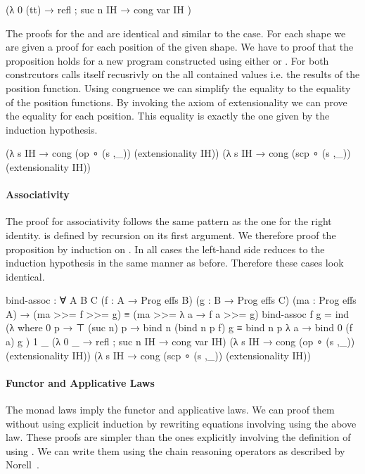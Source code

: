 \begin{AgdaAlign}
\begin{code}
  (λ{ {0} (tt) → refl ; {suc n} IH → cong var IH })
\end{code}
The proofs for the  and
 are identical and similar to the
 case. For each shape  we are
given a proof for each position of the given shape.
We have to proof that the proposition holds for a new program constructed using
either  or .
For both constrcutors \AgdaSpace{} calls
itself recusrivly on the all contained values i.e. the results of the position
function.
Using congruence we can simplify the equality to the equality of the position
functions.
By invoking the axiom of extensionality we can prove the equality for each
position.
This equality is exactly the one given by the induction hypothesis.

\begin{code}
  (λ s IH → cong (op   ∘ (s ,_)) (extensionality IH))
  (λ s IH → cong (scp  ∘ (s ,_)) (extensionality IH))
\end{code}
\end{AgdaAlign}

\paragraph{Associativity}
The proof for associativity follows the same pattern as the one for the right
identity.
\AgdaFunction{>>=} is defined by recursion on its first argument.
We therefore proof the proposition by induction on .
In all cases the left-hand side reduces to the induction hypothesis in the same
manner as before.
Therefore these cases look identical.

\begin{code}
bind-assoc : ∀ {A B C}
  (f : A → Prog effs B) (g : B → Prog effs C) (ma : Prog effs A) →
  (ma >>= f >>= g) ≡ (ma >>= λ a → f a >>= g)
bind-assoc f g = ind
  (λ where
    0 p        → ⊤
    (suc n) p  → bind n (bind n p f) g ≡ bind n p λ a → bind 0 (f a) g
  ) 1 _
  (λ{ {0} _ → refl ; {suc n} IH → cong var IH})
  (λ s IH → cong (op   ∘ (s ,_)) (extensionality IH))
  (λ s IH → cong (scp  ∘ (s ,_)) (extensionality IH))
\end{code}

\paragraph{Functor and Applicative Laws}
The monad laws imply the functor and applicative laws.
We can proof them without using explicit induction by rewriting equations
involving \AgdaFunction{>>=} using the above law.
These proofs are simpler than the ones explicitly involving the definition of
\AgdaFunction{>>=} using .
We can write them using the chain reasoning operators as described by
Norell~\cite{norell:thesis}.

